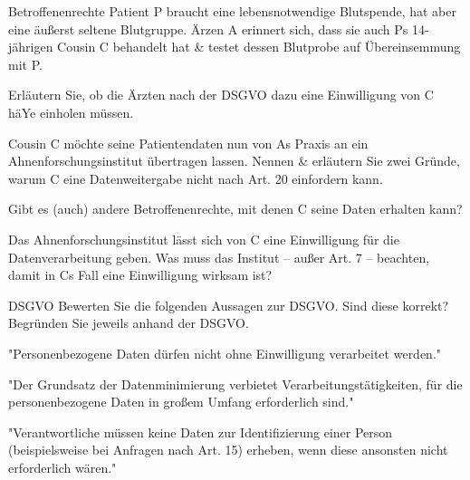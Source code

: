 \documentclass{exercisesheet}
\begin{document}
\begin{eexercises}{Betroffenenrechte}{
    Patient P braucht eine lebensnotwendige Blutspende, hat aber eine äußerst seltene Blutgruppe. Ärzen A erinnert sich, dass sie auch Ps 14-jährigen Cousin C behandelt hat \& testet dessen Blutprobe auf Übereinsemmung mit P.
  }
  \item Erläutern Sie, ob die Ärzten nach der DSGVO dazu eine Einwilligung von C häYe einholen müssen.
  \item Cousin C möchte seine Patientendaten nun von As Praxis an ein Ahnenforschungsinstitut übertragen lassen. Nennen \& erläutern Sie zwei Gründe, warum C eine Datenweitergabe nicht nach Art. 20 einfordern kann.
  \item Gibt es (auch) andere Betroffenenrechte, mit denen C seine Daten erhalten kann?
  \item Das Ahnenforschungsinstitut lässt sich von C eine Einwilligung für die Datenverarbeitung geben. Was muss das Institut – außer Art. 7 – beachten, damit in Cs Fall eine Einwilligung wirksam ist?
\end{eexercises}

\begin{eexercises}{DSGVO}{
    Bewerten Sie die folgenden Aussagen zur DSGVO. Sind diese korrekt? Begründen Sie jeweils anhand der DSGVO.
  }
  \item "Personenbezogene Daten dürfen nicht ohne Einwilligung verarbeitet werden."
  \item "Der Grundsatz der Datenminimierung verbietet Verarbeitungstätigkeiten, für die personenbezogene Daten in großem Umfang erforderlich sind."
  \item "Verantwortliche müssen keine Daten zur Identifizierung einer Person (beispielsweise bei Anfragen nach Art. 15) erheben, wenn diese ansonsten nicht erforderlich wären."
\end{eexercises}
\end{document}
